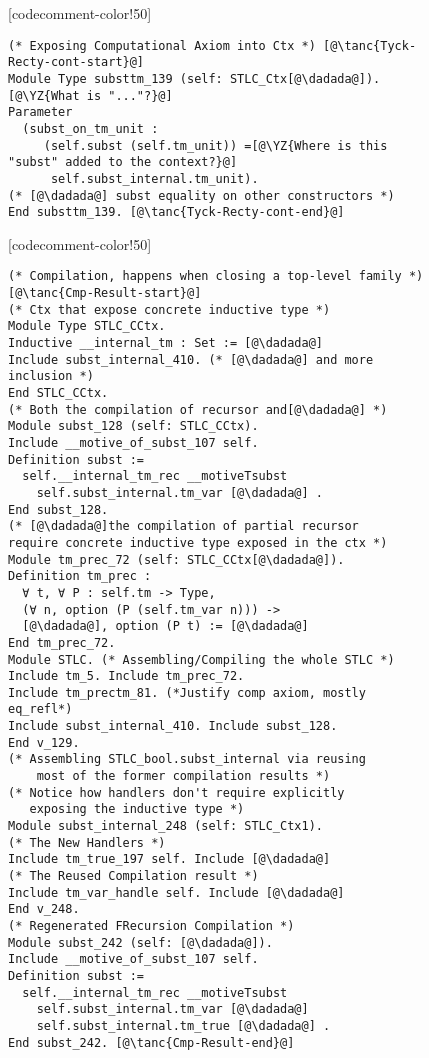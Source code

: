 \begin{figure}
\begin{minipage}{\textwidth}
\begin{multicols}{2}
[codecomment-color!50]

\columnbreak



\begin{lstlisting}
(* Exposing Computational Axiom into Ctx *) [@\tanc{Tyck-Recty-cont-start}@]
Module Type substtm_139 (self: STLC_Ctx[@\dadada@]).[@\YZ{What is "..."?}@]
Parameter
  (subst_on_tm_unit :
	 (self.subst (self.tm_unit)) =[@\YZ{Where is this "subst" added to the context?}@]
      self.subst_internal.tm_unit).
(* [@\dadada@] subst equality on other constructors *)
End substtm_139. [@\tanc{Tyck-Recty-cont-end}@]
\end{lstlisting}



[codecomment-color!50]



\begin{lstlisting}
(* Compilation, happens when closing a top-level family *) [@\tanc{Cmp-Result-start}@]
(* Ctx that expose concrete inductive type *)
Module Type STLC_CCtx.
Inductive __internal_tm : Set := [@\dadada@] 
Include subst_internal_410. (* [@\dadada@] and more inclusion *)
End STLC_CCtx.
(* Both the compilation of recursor and[@\dadada@] *)
Module subst_128 (self: STLC_CCtx).
Include __motive_of_subst_107 self.
Definition subst :=
  self.__internal_tm_rec __motiveTsubst
	self.subst_internal.tm_var [@\dadada@] .
End subst_128.
(* [@\dadada@]the compilation of partial recursor 
require concrete inductive type exposed in the ctx *)
Module tm_prec_72 (self: STLC_CCtx[@\dadada@]).
Definition tm_prec :
  ∀ t, ∀ P : self.tm -> Type,
  (∀ n, option (P (self.tm_var n))) ->
  [@\dadada@], option (P t) := [@\dadada@]
End tm_prec_72. 
Module STLC. (* Assembling/Compiling the whole STLC *)
Include tm_5. Include tm_prec_72. 
Include tm_prectm_81. (*Justify comp axiom, mostly eq_refl*)
Include subst_internal_410. Include subst_128.
End v_129.
(* Assembling STLC_bool.subst_internal via reusing 
    most of the former compilation results *)
(* Notice how handlers don't require explicitly
   exposing the inductive type *)
Module subst_internal_248 (self: STLC_Ctx1).
(* The New Handlers *)
Include tm_true_197 self. Include [@\dadada@]
(* The Reused Compilation result *)
Include tm_var_handle self. Include [@\dadada@]
End v_248. 
(* Regenerated FRecursion Compilation *)
Module subst_242 (self: [@\dadada@]).
Include __motive_of_subst_107 self.
Definition subst :=
  self.__internal_tm_rec __motiveTsubst
	self.subst_internal.tm_var [@\dadada@]
    self.subst_internal.tm_true [@\dadada@] .
End subst_242. [@\tanc{Cmp-Result-end}@]
\end{lstlisting}




\end{multicols}
\end{minipage}
\end{figure}
